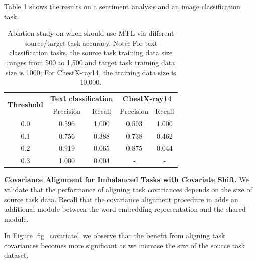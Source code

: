 Table \ref{tab:mtl_better_than_stl} shows the results on a sentiment analysis and an image classification task.

\begin{table}
\begin{center}
  \begin{tabular}{c c c c c}
  \toprule
    \multirow{2}{*}{{\bf Threshold}}  & \multicolumn{2}{c}{{\bf Text classification}} & \multicolumn{2}{c}{{\bf ChestX-ray14}} \\
    & Precision &  Recall & Precision &  Recall \\
    \cmidrule(lr){1-1} \cmidrule(lr){2-3} \cmidrule(lr){4-5}
    0.0 & 0.596 & 1.000 & 0.593 & 1.000 \\
    0.1 & 0.756 & 0.388 & 0.738 & 0.462 \\
    0.2 & 0.919 & 0.065 & 0.875 & 0.044 \\	
    0.3 & 1.000 & 0.004 &     - &     - \\
  \bottomrule
  \end{tabular}
\end{center}
\caption{Ablation study on when should use MTL via different source/target task accuracy. Note: For text classification tasks, the source task training data size ranges from 500 to 1,500 and target task training data size is 1000; For ChestX-ray14, the training data size is 10,000.}
\label{tab:mtl_better_than_stl}
\end{table}


\textbf{Covariance Alignment for Imbalanced Tasks with Covariate Shift.}
We validate that the performance of aligning task covariances depends on the size of source task data.
Recall that the covariance alignment procedure in \cite{WZR20} adds an additional module between the word embedding representation and the shared module.

In Figure \ref{fig_covariate}, we observe that the benefit from aligning task covariances becomes more significant as we increase the size of the source task dataset.

